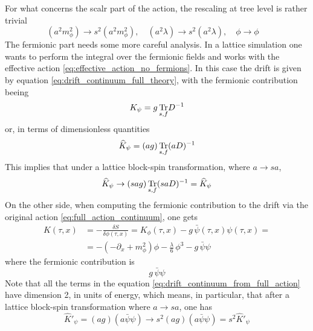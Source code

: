 For what concerns the scalr part of the action, the rescaling at tree level is rather trivial 
\begin{equation*}
    (a^2m_\phi^2) \to s^2(a^2m_\phi^2), \quad (a^2\lambda) \to s^2 (a^2\lambda), \quad \phi \to \phi \quad
\end{equation*}
The fermionic part needs some more careful analysis. 
In a lattice simulation one wants to perform the integral over the fermionic fields and works with the effective action \eqref{eq:effective_action_no_fermions}. In this case the drift is given by equation \eqref{eq:drift_continuum_full_theory}, with the fermionic contribution beeing
\begin{equation*}
    K_{\psi} = g \, \underset{s,f}{\operatorname{\text{Tr}}}{D^{-1}}
\end{equation*}
or, in terms of dimensionless quantities
\begin{equation*}
    \widehat{K}_{\psi} = (ag) \, \underset{s,f}{\operatorname{\text{Tr}}}{(aD)^{-1}}
\end{equation*}
This implies that under a lattice block-spin transformation, where $a \to sa$,
\begin{equation}
    \widehat{K}_{\psi} \to  (sag) \, \underset{s,f}{\operatorname{\text{Tr}}}{(saD)^{-1}} = \widehat{K}_{\psi}
    \label{eq:fermionic_rescaling_naive}
\end{equation}
On the other side, when computing the fermionic contribution to the drift via the original action \eqref{eq:full_action_continuum}, one gets
\begin{equation*}
    \begin{aligned}
        K(\tau, x) &= - \frac{\delta S}{\delta \phi(\tau, x)} = K_\phi(\tau, x) - g \, \bar\psi(\tau, x)\psi(\tau,x) = \\
        &= -\left(-\partial_x + m_\phi^2\right) \phi - \frac{\lambda}{6} \, \phi^3 - g \, \bar\psi\psi
    \end{aligned}
    \label{eq:drift_continuum_from_full_action}
\end{equation*}
where the fermionic contribution is 
\begin{equation*}
    g \, \bar\psi\psi
\end{equation*}
Note that all the terms in the equation \eqref{eq:drift_continuum_from_full_action} have dimension 2, in units of energy, which means, in particular, that after a lattice block-spin transformation where $a \to sa$, one has
\begin{equation}
    \widehat{K}'_\psi = (ag) (a\bar\psi \psi) \to s^2 (ag) (a\bar\psi \psi) = s^2 \widehat{K}'_\psi
    \label{eq:rescaling_blinear}
\end{equation}
